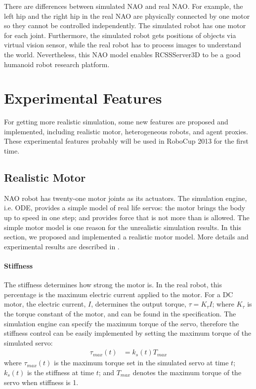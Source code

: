 \documentclass{llncs}
\begin{document}
There are differences between simulated NAO and real NAO. For example, the left hip and the right hip in the real NAO are physically connected by one motor so they cannot be controlled independently. The simulated robot has one motor for each joint. Furthermore, the simulated robot gets positions of objects via virtual vision sensor, while the real robot has to process images to understand the world. Nevertheless, this NAO model enables RCSSServer3D to be a good humanoid robot research platform.


\section{Experimental Features}
\label{s:ongoing}

For getting more realistic simulation, some new features are proposed and implemented, including realistic motor, heterogeneous robots, and agent proxies.
These experimental features probably will be used in RoboCup 2013 for the first time.

\subsection{Realistic Motor}
NAO robot has twenty-one motor joints as its actuators.
The simulation engine, i.e. ODE, provides a simple model of real life servos:
the motor brings the body up to speed in one step; and provides force that is not more than is allowed.
The simple motor model is one reason for the unrealistic simulation results.
In this section, we proposed and implemented a realistic motor model. More details and experimental results are described in \cite{Xu2012}.

\paragraph{Stiffness}
The stiffness determines how strong the motor is.
In the real robot, this percentage is the maximum electric current applied to the motor.
For a DC motor, the electric current, $I$, determines the output torque,
$\tau = K_\tau I \label{eq:tau-i}$;
where $K_\tau$ is the torque constant of the motor, and can be found in the
specification.
The simulation engine can specify the maximum torque of the servo, therefore the
stiffness control can be easily implemented by setting the maximum torque
of the simulated servo:
\begin{align}
  \tau_{max}(t) &= k_{s}(t) T_{max}
\end{align}
where $\tau_{max}(t)$ is the maximum torque set in the simulated servo at
time $t$; $k_{s}(t)$ is the stiffness at time $t$; and $T_{max}$
denotes the maximum torque of the servo when stiffness is 1.
\end{document}
